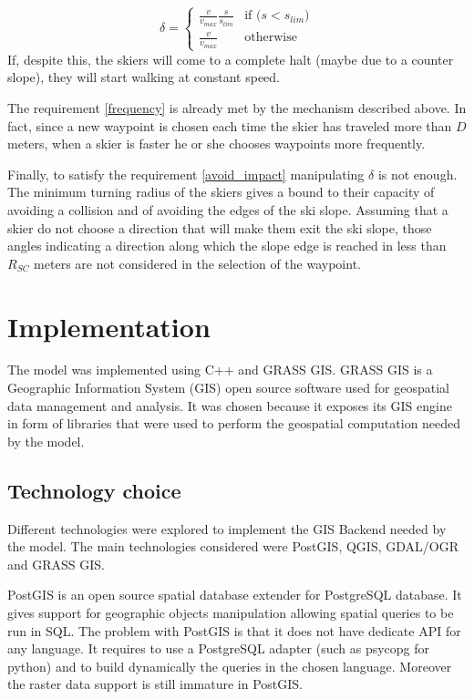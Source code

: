 \documentclass[12pt,a4paper,twoside]{book}
\begin{document}
\begin{equation}
\delta=\begin{cases}
   \frac{v}{v_{max}}\frac{s}{s_{lim}} & \text{if ($s < s_{lim}$)} \\
   \frac{v}{v_{max}} & \text{otherwise}
\end{cases}
\end{equation}
If, despite this, the skiers will come to a complete halt (maybe due to a counter slope), they will start walking at constant speed.

The requirement \ref{frequency} is already met by the mechanism described above. In fact, since a new waypoint is chosen each time the skier has traveled more than $D$ meters, when a skier is faster he or she chooses waypoints more frequently.

Finally, to satisfy the requirement \ref{avoid_impact} manipulating $\delta$ is not enough. The minimum turning radius of the skiers gives a bound to their capacity of avoiding a collision and of avoiding the edges of the ski slope. Assuming that a skier do not choose a direction that will make them exit the ski slope, those angles indicating a direction along which the slope edge is reached in less than $R_{SC}$ meters are not considered in the selection of the waypoint.

\chapter{Implementation}\label{implementation}
The model was implemented using C++ and GRASS GIS. GRASS GIS is a Geographic Information System (GIS) open source software used for geospatial data management and analysis. It was chosen because it exposes its GIS engine in form of libraries that were used to perform the geospatial computation needed by the model.

\section{Technology choice}
Different technologies were explored to implement the GIS Backend needed by the model. The main technologies considered were PostGIS, QGIS, GDAL/OGR and GRASS GIS.

PostGIS is an open source spatial database extender for PostgreSQL database. It gives support for geographic objects manipulation allowing spatial queries to be run in SQL. The problem with PostGIS is that it does not have dedicate API for any language. It requires to use a PostgreSQL adapter (such as psycopg for python) and to build dynamically the queries in the chosen language. Moreover the raster data support is still immature in PostGIS.
\end{document}
